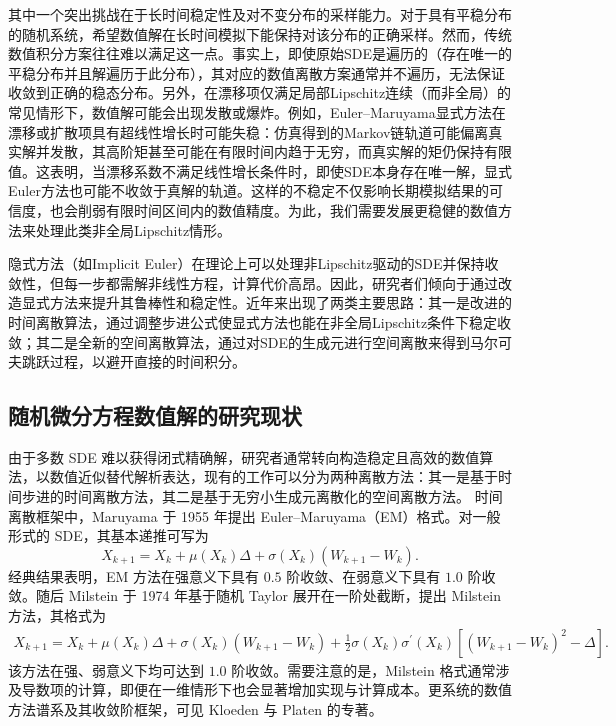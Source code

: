 	其中一个突出挑战在于长时间稳定性及对不变分布的采样能力。对于具有平稳分布的随机系统，希望数值解在长时间模拟下能保持对该分布的正确采样。然而，传统数值积分方案往往难以满足这一点。事实上，即使原始SDE是遍历的（存在唯一的平稳分布并且解遍历于此分布），其对应的数值离散方案通常并不遍历，无法保证收敛到正确的稳态分布。另外，在漂移项仅满足局部Lipschitz连续（而非全局）的常见情形下，数值解可能会出现发散或爆炸。例如，Euler–Maruyama显式方法在漂移或扩散项具有超线性增长时可能失稳：仿真得到的Markov链轨道可能偏离真实解并发散，其高阶矩甚至可能在有限时间内趋于无穷，而真实解的矩仍保持有限值。这表明，当漂移系数不满足线性增长条件时，即使SDE本身存在唯一解，显式Euler方法也可能不收敛于真解的轨道。这样的不稳定不仅影响长期模拟结果的可信度，也会削弱有限时间区间内的数值精度。为此，我们需要发展更稳健的数值方法来处理此类非全局Lipschitz情形。
	
	隐式方法（如Implicit Euler）在理论上可以处理非Lipschitz驱动的SDE并保持收敛性，但每一步都需解非线性方程，计算代价高昂。因此，研究者们倾向于通过改造显式方法来提升其鲁棒性和稳定性。近年来出现了两类主要思路：其一是改进的时间离散算法，通过调整步进公式使显式方法也能在非全局Lipschitz条件下稳定收敛；其二是全新的空间离散算法，通过对SDE的生成元进行空间离散来得到马尔可夫跳跃过程，以避开直接的时间积分。
	

\subsection{随机微分方程数值解的研究现状}

由于多数 SDE 难以获得闭式精确解，研究者通常转向构造稳定且高效的数值算法，以数值近似替代解析表达，现有的工作可以分为两种离散方法：其一是基于时间步进的时间离散方法，其二是基于无穷小生成元离散化的空间离散方法。
时间离散框架中，Maruyama 于 1955 年提出 Euler--Maruyama（EM）格式\cite{Maruyama1955}。对一般形式的 SDE，其基本递推可写为
\begin{equation}
	X_{k+1}=X_{k}+ \mu \left(X_{k}\right) \Delta
	+\sigma \left(X_{k}\right)\left(W_{k+1}-W_{k}\right).
\end{equation}
经典结果表明，EM 方法在强意义下具有 $0.5$ 阶收敛、在弱意义下具有 $1.0$ 阶收敛。随后 Milstein 于 1974 年基于随机 Taylor 展开在一阶处截断，提出 Milstein 方法\cite{Milstein1975}，其格式为
\begin{equation}
	\begin{aligned}
		X_{k+1}=X_{k}+\mu \left(X_{k}\right) \Delta
		+\sigma \left(X_{k}\right)\left(W_{k+1}-W_{k}\right)
		+\frac{1}{2} \sigma\left(X_{k}\right) \sigma^{\prime}\left(X_{k}\right)
		\left[\left(W_{k+1}-W_{k}\right)^{2}-\Delta \right].
	\end{aligned}
\end{equation}
该方法在强、弱意义下均可达到 $1.0$ 阶收敛\cite{weinan2021applied}。需要注意的是，Milstein 格式通常涉及导数项的计算，即便在一维情形下也会显著增加实现与计算成本。更系统的数值方法谱系及其收敛阶框架，可见 Kloeden 与 Platen 的专著\cite{kloeden1992stochastic}。

